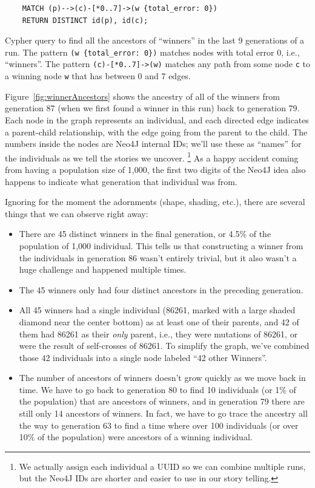 \begin{Query}
	\begin{verbatim}
	MATCH (p)-->(c)-[*0..7]->(w {total_error: 0}) 
	RETURN DISTINCT id(p), id(c);
	\end{verbatim}
	\caption{Cypher query to find all the ancestors of ``winners'' in the last 9 generations of a run.
		The pattern \texttt{(w \{total\_error: 0\})} matches nodes with total error 0, i.e., 
		``winners''. The pattern \texttt{(c)-[*0..7]->(w)} matches any path from some node \texttt{c} to
		a winning node \texttt{w} that has between 0 and 7 edges.
		}
	\label{query:winnerAncestors}
\end{Query}

Figure~\ref{fig:winnerAncestors} shows the ancestry of all of the winners from generation 87 
(when we first found a winner in this run) back to generation 79.
Each node in the graph represents an individual, and each directed edge indicates a parent-child
relationship, with the edge going from the parent to the child. The numbers inside the nodes are
Neo4J internal IDs; we'll use these as ``names'' for the individuals as we tell the stories we uncover.
\footnote{We actually assign each individual a UUID so we can combine multiple runs, but
	the Neo4J IDs are shorter and easier to use in our story telling.} As a happy accident coming
from having a population size of 1,000, the first two digits of the Neo4J idea also happens to indicate
what generation that individual was from.

Ignoring for the moment the adornments (shape, shading, etc.), there are several things that
we can observe right away:
\begin{itemize}
	\item There are 45 distinct winners in the final generation, or 4.5\% of the population of
	1,000 individual. This tells us that constructing a winner from the individuals in generation 86
	wasn't entirely trivial, but it also wasn't a huge challenge and happened multiple times.
	\item The 45 winners only had four distinct ancestors in the preceding generation.
	\item All 45 winners had a single individual (86261, marked with a large shaded diamond near
	the center bottom) as at least one of their parents, and 42 of
	them had 86261 as their \emph{only} parent, i.e., they were mutations of 86261, or were the result
	of self-crosses of 86261. To simplify the graph, we've combined those 42 individuals into a
	single node labeled ``42 other Winners''.
	\item The number of ancestors of winners doesn't grow quickly as we move back in time. We have to
	go back to generation 80 to find 10 individuals (or 1\% of the population) that are ancestors of
	winners, and in generation 79 there are still only 14 ancestors of winners. In fact, we have to
	go trace the ancestry all the way to generation 63 to find a time where over 100 individuals (or over 10\% of 
	the population) were ancestors of a winning individual.
\end{itemize}

